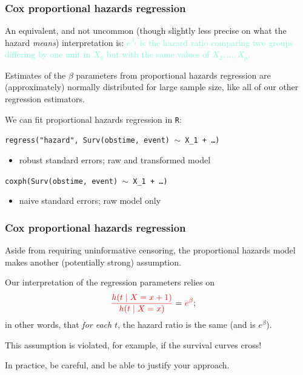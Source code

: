 \documentclass[12pt, 
hyperref={colorlinks=true, linkcolor=blue, urlcolor=cyan},dvipsnames]{beamer}
\begin{document}
\begin{frame}
\frametitle{Cox proportional hazards regression}
An equivalent, and not uncommon (though slightly less precise on what the hazard \textit{means}) interpretation is: \textcolor{Aquamarine}{$e^{\beta_1}$ is the hazard ratio comparing two groups differing by one unit in $X_1$ but with the same values of $X_2, \dots, X_p$.}

Estimates of the $\beta$ parameters from proportional hazards regression are (approximately) normally distributed for large sample size, like all of our other regression estimators.

We can fit proportional hazards regression in \texttt{R}:

{\small \texttt{regress("hazard", Surv(obstime, event) $\sim$ X\_1 + \dots)}  } \vspace{-0.2cm}
\begin{itemize}
\item robust standard errors; raw and transformed model 
\end{itemize}

{\small \texttt{coxph(Surv(obstime, event) $\sim$ X\_1 + \dots)}}  \vspace{-0.2cm}
\begin{itemize}
\item naive standard errors; raw model only
\end{itemize}
\end{frame}

\begin{frame}
\frametitle{Cox proportional hazards regression}

Aside from requiring uninformative censoring, the proportional hazards model makes another (potentially strong) assumption.

Our interpretation of the regression parameters relies on
\begin{align*}
\textcolor{red}{\frac{h(t \mid X = x + 1)}{h(t \mid X = x)}} = & \ \textcolor{red}{e^{\beta}};
\end{align*}
in other words, that \textit{for each $t$}, the hazard ratio is the same (and is $e^{\beta}$).

This assumption is violated, for example, if the survival curves cross!

In practice, be careful, and be able to justify your approach.
\end{frame}
\end{document}
